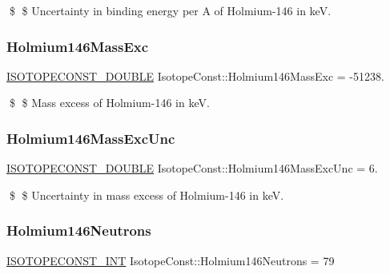 \$ \$ Uncertainty in binding energy per A of Holmium-\/146 in keV. \mbox{\label{group___isotope_const-_holmium-_ho146_gafd774882f48d80c4ffabf2d868752752}} 
\subsubsection{\texorpdfstring{Holmium146\+Mass\+Exc}{Holmium146MassExc}}
{\footnotesize\ttfamily \mbox{\hyperlink{group___isotope_const-_macros_ga8f45a7272ce02c0b4c65c44636ed719a}{I\+S\+O\+T\+O\+P\+E\+C\+O\+N\+S\+T\+\_\+\+D\+O\+U\+B\+LE}} Isotope\+Const\+::\+Holmium146\+Mass\+Exc = -\/51238.}

\$ \$ Mass excess of Holmium-\/146 in keV. \mbox{\label{group___isotope_const-_holmium-_ho146_ga38263e7fabf64186e74be31091d7ba33}} 
\subsubsection{\texorpdfstring{Holmium146\+Mass\+Exc\+Unc}{Holmium146MassExcUnc}}
{\footnotesize\ttfamily \mbox{\hyperlink{group___isotope_const-_macros_ga8f45a7272ce02c0b4c65c44636ed719a}{I\+S\+O\+T\+O\+P\+E\+C\+O\+N\+S\+T\+\_\+\+D\+O\+U\+B\+LE}} Isotope\+Const\+::\+Holmium146\+Mass\+Exc\+Unc = 6.}

\$ \$ Uncertainty in mass excess of Holmium-\/146 in keV. \mbox{\label{group___isotope_const-_holmium-_ho146_gab0503c379b7e9c462d2a320d8b111edb}} 
\subsubsection{\texorpdfstring{Holmium146\+Neutrons}{Holmium146Neutrons}}
{\footnotesize\ttfamily \mbox{\hyperlink{group___isotope_const-_macros_ga5f18360b3e99483a35c32d789e62621c}{I\+S\+O\+T\+O\+P\+E\+C\+O\+N\+S\+T\+\_\+\+I\+NT}} Isotope\+Const\+::\+Holmium146\+Neutrons = 79}

